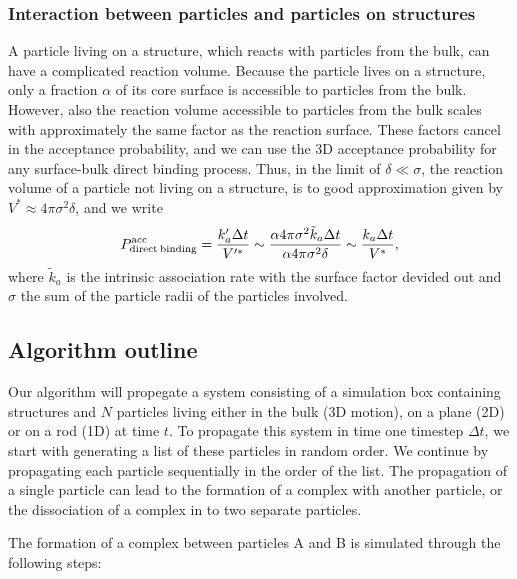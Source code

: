 \subsubsection{Interaction between particles and particles on structures}
A particle living on a structure, which reacts with particles from the bulk, can have a complicated reaction volume. Because the particle lives on a structure, only a fraction $\alpha$ of its core surface is accessible to particles from the bulk. However, also the reaction volume accessible to particles from the bulk scales with approximately the same factor as the reaction surface. These factors cancel in the acceptance probability, and we can use the 3D acceptance probability for any surface-bulk direct binding process. Thus, in the limit of $\delta \ll \sigma$, the reaction volume of a particle not living on a structure, is to good approximation given by $V^* \approx 4 \pi \sigma^2 \delta$, and we write
\begin{equation}
 P^{\rm acc}_{\rm direct\:binding} = \frac{k'_a \Delta t}{V'^*} \sim \frac{ \alpha 4 \pi \sigma^2 \tilde{k}_a \Delta t}{\alpha 4 \pi \sigma^2 \delta} \sim \frac{k_a \Delta t}{V^*},
\end{equation}
where $\tilde{k}_a$ is the intrinsic association rate with the surface factor devided out and $\sigma$ the sum of the particle radii of the particles involved.

\subsection{Algorithm outline}
Our algorithm will propegate a system consisting of a simulation box containing structures and $N$ particles living either in the bulk (3D motion), on a plane (2D) or on a rod (1D) at time $t$. To propagate this system in time one timestep $\Delta t$, we start with generating a list of these particles in random order. We continue by propagating each particle sequentially in the order of the list. The propagation of a single particle can lead to the formation of a complex with another particle, or the dissociation of a complex in to two separate particles. 

The formation of a complex between particles A and B is simulated through the following steps:

